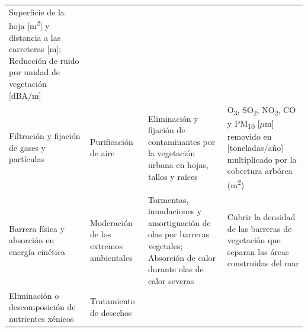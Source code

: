 \documentclass[12pt,a4paper,openany]{book}
\theoremstyle{definition}
\theoremstyle{definition}
\theoremstyle{definition}
\theoremstyle{remark}
\begin{document}
\begin{longtable}[]{@{}llll@{}}
\begin{minipage}[t]{0.22\columnwidth}
Superficie de la hoja {[}m\textsuperscript{2}{]} y distancia a las
carreteras {[}m{]}; Reducción de ruido por unidad de vegetación
{[}dBA/m{]}\strut
\end{minipage}\tabularnewline
\begin{minipage}[t]{0.26\columnwidth}\raggedright\strut
Filtración y fijación de gases y partículas\strut
\end{minipage} & \begin{minipage}[t]{0.22\columnwidth}\raggedright\strut
Purificación de aire\strut
\end{minipage} & \begin{minipage}[t]{0.19\columnwidth}\raggedright\strut
Eliminación y fijación de contaminantes por la vegetación urbana en
hojas, tallos y raíces\strut
\end{minipage} & \begin{minipage}[t]{0.22\columnwidth}\raggedright\strut
O\textsubscript{3}, SO\textsubscript{2}, NO\textsubscript{2}, CO y
PM\textsubscript{10} {[}\(\mu\)m{]} removido en {[}toneladas/año{]}
multiplicado por la cobertura arbórea (m\textsuperscript{2})\strut
\end{minipage}\tabularnewline
\begin{minipage}[t]{0.26\columnwidth}\raggedright\strut
Barrera física y absorción en energía cinética\strut
\end{minipage} & \begin{minipage}[t]{0.22\columnwidth}\raggedright\strut
Moderación de los extremos ambientales\strut
\end{minipage} & \begin{minipage}[t]{0.19\columnwidth}\raggedright\strut
Tormentas, inundaciones y amortiguación de olas por barreras vegetales;
Absorción de calor durante olas de calor severas\strut
\end{minipage} & \begin{minipage}[t]{0.22\columnwidth}\raggedright\strut
Cubrir la densidad de las barreras de vegetación que separan las áreas
construidas del mar\strut
\end{minipage}\tabularnewline
\begin{minipage}[t]{0.26\columnwidth}\raggedright\strut
Eliminación o descomposición de nutrientes xénicos\strut
\end{minipage} & \begin{minipage}[t]{0.22\columnwidth}\raggedright\strut
Tratamiento de desechos\strut
\end{minipage} & \begin{minipage}[t]{0.19\columnwidth}\raggedright\strut

\end{minipage}
\end{longtable}
\end{document}
